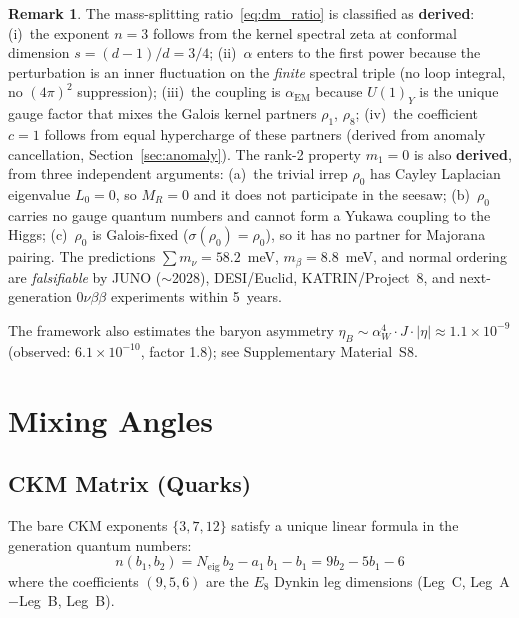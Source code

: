 \documentclass[12pt,a4paper]{article}
\theoremstyle{definition}
\newtheorem{remark}{Remark}
\begin{document}
\begin{remark}
The mass-splitting ratio~\eqref{eq:dm_ratio} is classified as \textbf{derived}: (i)~the exponent $n = 3$ follows from the kernel spectral zeta at conformal dimension $s = (d{-}1)/d = 3/4$; (ii)~$\alpha$ enters to the first power because the perturbation is an inner fluctuation on the \emph{finite} spectral triple (no loop integral, no $(4\pi)^2$ suppression); (iii)~the coupling is $\alpha_{\text{EM}}$ because $U(1)_Y$ is the unique gauge factor that mixes the Galois kernel partners $\rho_1$, $\rho_8$; (iv)~the coefficient $c = 1$ follows from equal hypercharge of these partners (derived from anomaly cancellation, Section~\ref{sec:anomaly}).  The rank-2 property $m_1 = 0$ is also \textbf{derived}, from three independent arguments: (a)~the trivial irrep $\rho_0$ has Cayley Laplacian eigenvalue $L_0 = 0$, so $M_R = 0$ and it does not participate in the seesaw; (b)~$\rho_0$ carries no gauge quantum numbers and cannot form a Yukawa coupling to the Higgs; (c)~$\rho_0$ is Galois-fixed ($\sigma(\rho_0) = \rho_0$), so it has no partner for Majorana pairing.  The predictions $\sum m_\nu = 58.2$~meV, $m_\beta = 8.8$~meV, and normal ordering are \emph{falsifiable} by JUNO ($\sim$2028), DESI/Euclid, KATRIN/Project~8, and next-generation $0\nu\beta\beta$ experiments within 5~years.
\end{remark}

The framework also estimates the baryon asymmetry $\eta_B \sim \alpha_W^4 \cdot J \cdot |\eta| \approx 1.1 \times 10^{-9}$ (observed: $6.1 \times 10^{-10}$, factor 1.8); see Supplementary Material~S8.


\section{Mixing Angles}
\label{sec:mixing}

\subsection{CKM Matrix (Quarks)}
\label{sec:ckm}

The bare CKM exponents $\{3, 7, 12\}$ satisfy a unique linear formula in the generation quantum numbers:
\begin{equation}
\boxed{n(b_1, b_2) = N_{\text{eig}}\, b_2 - a_1\, b_1 - b_1 = 9b_2 - 5b_1 - 6}
\end{equation}
where the coefficients $(9, 5, 6)$ are the $E_8$ Dynkin leg dimensions (Leg~C, Leg~A$-$Leg~B, Leg~B).
\end{document}
